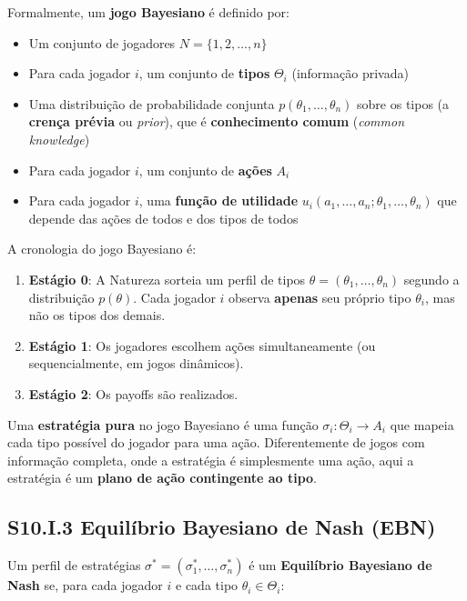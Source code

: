 Formalmente, um \textbf{jogo Bayesiano} é definido por:

\begin{itemize}
    \item Um conjunto de jogadores $N = \{1, 2, \ldots, n\}$
    \item Para cada jogador $i$, um conjunto de \textbf{tipos} $\Theta_i$ (informação privada)
    \item Uma distribuição de probabilidade conjunta $p(\theta_1, \ldots, \theta_n)$ sobre os tipos (a \textbf{crença prévia} ou \textit{prior}), que é \textbf{conhecimento comum} (\textit{common knowledge})
    \item Para cada jogador $i$, um conjunto de \textbf{ações} $A_i$
    \item Para cada jogador $i$, uma \textbf{função de utilidade} $u_i(a_1, \ldots, a_n; \theta_1, \ldots, \theta_n)$ que depende das ações de todos e dos tipos de todos
\end{itemize}

A cronologia do jogo Bayesiano é:

\begin{enumerate}
    \item \textbf{Estágio 0}: A Natureza sorteia um perfil de tipos $\theta = (\theta_1, \ldots, \theta_n)$ segundo a distribuição $p(\theta)$. Cada jogador $i$ observa \textbf{apenas} seu próprio tipo $\theta_i$, mas não os tipos dos demais.
    
    \item \textbf{Estágio 1}: Os jogadores escolhem ações simultaneamente (ou sequencialmente, em jogos dinâmicos).
    
    \item \textbf{Estágio 2}: Os payoffs são realizados.
\end{enumerate}

Uma \textbf{estratégia pura} no jogo Bayesiano é uma função $\sigma_i: \Theta_i \to A_i$ que mapeia cada tipo possível do jogador para uma ação. Diferentemente de jogos com informação completa, onde a estratégia é simplesmente uma ação, aqui a estratégia é um \textbf{plano de ação contingente ao tipo}.

\subsection*{S10.I.3 Equilíbrio Bayesiano de Nash (EBN)}

Um perfil de estratégias $\sigma^* = (\sigma_1^*, \ldots, \sigma_n^*)$ é um \textbf{Equilíbrio Bayesiano de Nash} se, para cada jogador $i$ e cada tipo $\theta_i \in \Theta_i$:


